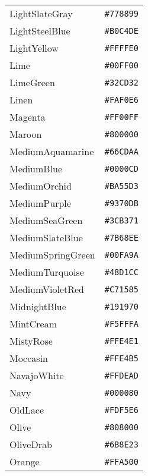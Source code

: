 \documentclass[a4paper]{article}
\begin{document}
\begin{longtable}{|l|r|}
LightSlateGray & \texttt{\#778899} \cellcolor[HTML]{778899} \\
LightSteelBlue & \texttt{\#B0C4DE} \cellcolor[HTML]{B0C4DE} \\
LightYellow & \texttt{\#FFFFE0} \cellcolor[HTML]{FFFFE0} \\
Lime & \texttt{\#00FF00} \cellcolor[HTML]{00FF00} \\
LimeGreen & \texttt{\#32CD32} \cellcolor[HTML]{32CD32} \\
Linen & \texttt{\#FAF0E6} \cellcolor[HTML]{FAF0E6} \\
Magenta & \texttt{\#FF00FF} \cellcolor[HTML]{FF00FF} \\
Maroon & \texttt{\#800000} \cellcolor[HTML]{800000} \\
MediumAquamarine & \texttt{\#66CDAA} \cellcolor[HTML]{66CDAA} \\
MediumBlue & \texttt{\#0000CD} \cellcolor[HTML]{0000CD} \\
MediumOrchid & \texttt{\#BA55D3} \cellcolor[HTML]{BA55D3} \\
MediumPurple & \texttt{\#9370DB} \cellcolor[HTML]{9370DB} \\
MediumSeaGreen & \texttt{\#3CB371} \cellcolor[HTML]{3CB371} \\
MediumSlateBlue & \texttt{\#7B68EE} \cellcolor[HTML]{7B68EE} \\
MediumSpringGreen & \texttt{\#00FA9A} \cellcolor[HTML]{00FA9A} \\
MediumTurquoise & \texttt{\#48D1CC} \cellcolor[HTML]{48D1CC} \\
MediumVioletRed & \texttt{\#C71585} \cellcolor[HTML]{C71585} \\
MidnightBlue & \texttt{\#191970} \cellcolor[HTML]{191970} \\
MintCream & \texttt{\#F5FFFA} \cellcolor[HTML]{F5FFFA} \\
MistyRose & \texttt{\#FFE4E1} \cellcolor[HTML]{FFE4E1} \\
Moccasin & \texttt{\#FFE4B5} \cellcolor[HTML]{FFE4B5} \\
NavajoWhite & \texttt{\#FFDEAD} \cellcolor[HTML]{FFDEAD} \\
Navy & \texttt{\#000080} \cellcolor[HTML]{000080} \\
OldLace & \texttt{\#FDF5E6} \cellcolor[HTML]{FDF5E6} \\
Olive & \texttt{\#808000} \cellcolor[HTML]{808000} \\
OliveDrab & \texttt{\#6B8E23} \cellcolor[HTML]{6B8E23} \\
Orange & \texttt{\#FFA500} \cellcolor[HTML]{FFA500} \\

\end{longtable}
\end{document}
